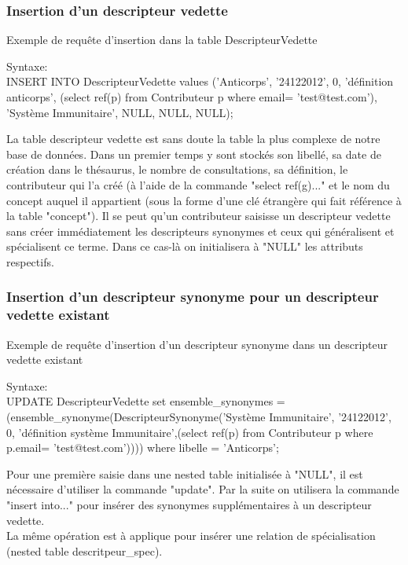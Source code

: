 \subsubsection{Insertion d'un descripteur vedette}

\begin{algorithm}[H]
\caption{\label{Requete_DescVedeete} Exemple de requête d'insertion dans la table DescripteurVedette}
Syntaxe:\\
INSERT INTO DescripteurVedette values ('Anticorps', '24122012', 0, 'définition anticorps', (select ref(p) from Contributeur p  where email= 'test@test.com'),
'Système Immunitaire', NULL, NULL, NULL);\\
\end{algorithm}

La table descripteur vedette est sans doute la table la plus complexe de notre base de données. Dans un premier temps y sont stockés son libellé, sa date de création dans le thésaurus, le nombre de consultations, sa définition, le contributeur qui l'a créé (à l'aide de la commande "select ref(g)..." et le nom du concept auquel il appartient (sous la forme d'une clé étrangère qui fait référence à la table "concept"). Il se peut qu'un contributeur saisisse un descripteur vedette sans créer immédiatement les descripteurs synonymes et ceux qui généralisent et spécialisent ce terme. Dans ce cas-là on initialisera à "NULL" les attributs respectifs.

\subsubsection{Insertion d'un descripteur synonyme pour un descripteur vedette existant}

\begin{algorithm}[H]
\caption{\label{Requete_DescSynonyme} Exemple de requête d'insertion d'un descripteur synonyme dans un descripteur vedette existant}
Syntaxe:\\
UPDATE DescripteurVedette set ensemble\_synonymes = (ensemble\_synonyme(DescripteurSynonyme('Système Immunitaire', '24122012', 0, 'définition système Immunitaire',(select ref(p) from Contributeur p  where p.email= 'test@test.com')))) where libelle = 'Anticorps';
\\
\end{algorithm}

Pour une première saisie dans une nested table initialisée à "NULL", il est nécessaire d'utiliser la commande "update". Par la suite on utilisera la commande "insert into..." pour insérer des synonymes supplémentaires à un descripteur vedette.\\
La même opération est à applique pour insérer une relation de spécialisation (nested table descritpeur\_spec).


